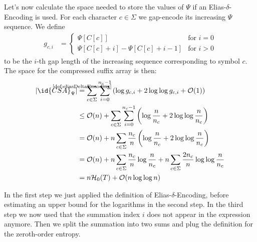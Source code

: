 Let's now calculate the space needed to store the values of $\Psi$ if an Elias-$\delta$-Encoding is used. For each character $c \in \Sigma$ we gap-encode its increasing $\Psi$ sequence. We define 
\begin{align}
  g_{c,i} &=
  \begin{cases}
    \Psi[C[c]] & \text{for $i = 0$} \\  
    \Psi[C[c] + i] - \Psi[C[c] + i - 1] & \text{for $i > 0$}
  \end{cases}
\end{align}
to be the $i$-th gap length of the increasing sequence corresponding to symbol $c$. The space for the compressed suffix array is then:
\begin{align}
  \begin{aligned}
    \vert \id{CSA}_\Psi \vert
    &\stackrel{\mathclap{\text{\ref{def:eliasDeltaEncoding}}}}{=}
    \sum\limits_{c \in \Sigma} \sum\limits_{i = 0}^{n_c - 1}
    \left(\log g_{c,i} + 2 \log\log g_{c,i} + \mathcal{O}(1)\right) \\
    &\leq\mathcal{O}(n) + \sum\limits_{c \in \Sigma}\sum\limits_{i = 0}^{n_c - 1}
    \left(\log\frac{n}{n_c}+2\log\log\frac{n}{n_c}\right) \\
    &=\mathcal{O}(n) + n\sum\limits_{c \in \Sigma}\frac{n_c}{n}
    \left(\log\frac{n}{n_c}+2\log\log\frac{n}{n_c}\right) \\
    &=\mathcal{O}(n) + n\sum\limits_{c \in \Sigma}\frac{n_c}{n}\log\frac{n}{n_c} + n\sum\limits_{c \in \Sigma}\frac{2n_c}{n}\log\log\frac{n}{n_c} \\
    &=n\mathcal{H}_0(T) + \mathcal{O}(n \log\log n)
  \end{aligned}
\end{align}

In the first step we just applied the definition of Elias-$\delta$-Encoding, before estimating an upper bound for the logarithms in the second step. In the third step we now used that the summation index $i$ does not appear in the expression anymore. Then we split the summation into two sums and plug the definition for the zeroth-order entropy.
